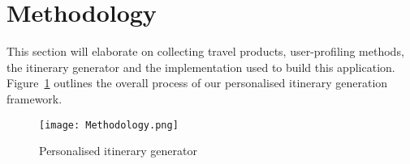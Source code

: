 \section{Methodology}

This section will elaborate on collecting travel
products, user-profiling methods, the itinerary generator and the
implementation used to build this application.
Figure~\ref{Methodology} outlines the overall process of our personalised
itinerary generation
framework. 

\begin{figure}[h]
\centering
\texttt{[image: Methodology.png]}
\caption{Personalised itinerary generator}
\label{Methodology}
\end{figure}






